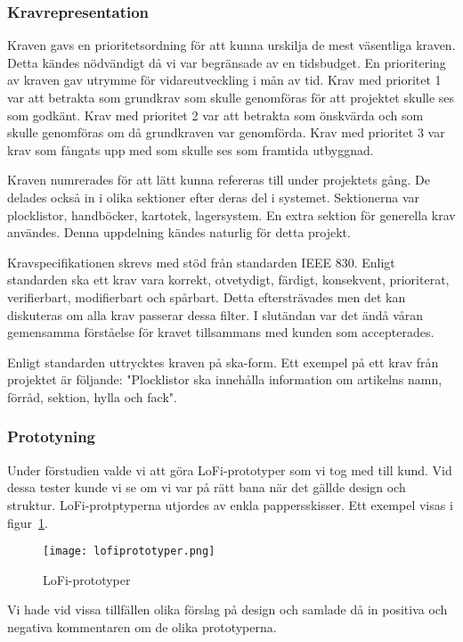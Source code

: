 \subsubsection{Kravrepresentation}
Kraven gavs en prioritetsordning för att kunna urskilja de mest väsentliga kraven. Detta kändes nödvändigt då vi var begränsade av en tidsbudget. En prioritering av kraven gav utrymme för vidareutveckling i mån av tid. Krav med prioritet 1 var att betrakta som grundkrav som skulle genomföras för att projektet skulle ses som godkänt. Krav med prioritet 2 var att betrakta som önskvärda och som skulle genomföras om då grundkraven var genomförda. Krav med prioritet 3 var krav som fångats upp med som skulle ses som framtida utbyggnad. 

Kraven numrerades för att lätt kunna refereras till under projektets gång. De delades också in i olika sektioner efter deras del i systemet. Sektionerna var plocklistor, handböcker, kartotek, lagersystem. En extra sektion för generella krav användes. Denna uppdelning kändes naturlig för detta projekt. 

Kravspecifikationen skrevs med stöd från standarden IEEE 830. Enligt standarden ska ett krav vara korrekt, otvetydigt, färdigt, konsekvent, prioriterat, verifierbart, modifierbart och spårbart. Detta eftersträvades men det kan diskuteras om alla krav passerar dessa filter. I slutändan var det ändå våran gemensamma förståelse för kravet tillsammans med kunden som accepterades. 

Enligt standarden uttrycktes kraven på ska-form. Ett exempel på ett krav från projektet är följande: "Plocklistor ska innehålla information om artikelns namn, förråd, sektion, hylla och fack".
\subsubsection{Prototyning}
Under förstudien valde vi att göra LoFi-prototyper som vi tog med till kund. Vid dessa tester kunde vi se om vi var på rätt bana när det gällde design och struktur. LoFi-protptyperna utjordes av enkla pappersskisser. Ett exempel visas i figur~\ref{fig:lofiprototyper}.

\begin{figure}[htbp]
\begin{center}
\texttt{[image: lofiprototyper.png]}
\caption{LoFi-prototyper}
\label{fig:lofiprototyper}
\end{center}
\end{figure}
Vi hade vid vissa tillfällen olika förslag på design och samlade då in positiva och negativa kommentaren om de olika prototyperna.



